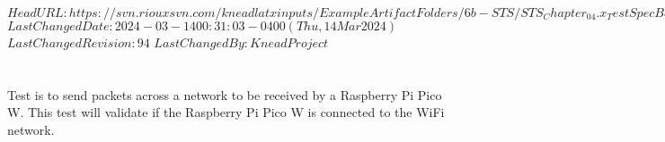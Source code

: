 \svnidlong
{$HeadURL: https://svn.riouxsvn.com/kneadlatxinputs/ExampleArtifactFolders/6b-STS/STS_Chapter_04.x_TestSpecBase.tex $}
{$LastChangedDate: 2024-03-14 00:31:03 -0400 (Thu, 14 Mar 2024) $}
{$LastChangedRevision: 94 $}
{$LastChangedBy: KneadProject $}

\section{\StsTestSpecID}
\label{loc:Test\StsTestSpecID}
% 

Test   is to send packets across a network to be received by a Raspberry Pi Pico W. This test will validate if the Raspberry Pi Pico W is connected to the WiFi network.

\renewcommand{\StsTestCaseID}{Packets}%


